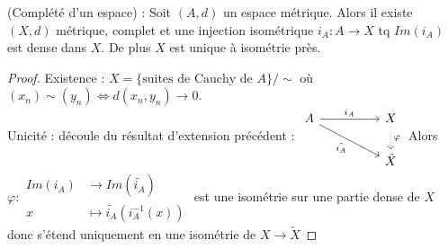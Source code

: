 \begin{propriete}
    (Complété d'un espace) : Soit $(A,d)$ un espace métrique. Alors il existe $(X,d)$ métrique, complet et une injection isométrique $i_A:A\to X$ tq $Im(i_A)$ est dense dans $X$. De plus $X$ est unique à isométrie près.
\end{propriete}
\begin{proof}
    Existence : $X=\{\text{suites de Cauchy de }A\} /\sim$ où $(x_{n})\sim(y_n)\Leftrightarrow d(x_n,y_n)\to 0$. \\
    Unicité : découle du résultat d'extension précédent :
$\begin{tikzcd}
    A && X\\
        && \tilde{X}
        \arrow["{i_A}", from=1-1, to=1-3]
        \arrow["{\tilde{i_A}}"', from=1-1, to=2-3]
    \arrow["\varphi", dotted, from=1-3, to=2-3]
\end{tikzcd}$
Alors $\varphi :\begin{aligned}Im(i_A)&\longrightarrow Im(\tilde{i_A}) \\ x&\longmapsto \tilde{i_A}(i_A^{-1} (x))\end{aligned}$ est une isométrie sur une partie dense de $X$ donc s'étend uniquement en une isométrie de $X\to \tilde{X}$
\end{proof}

